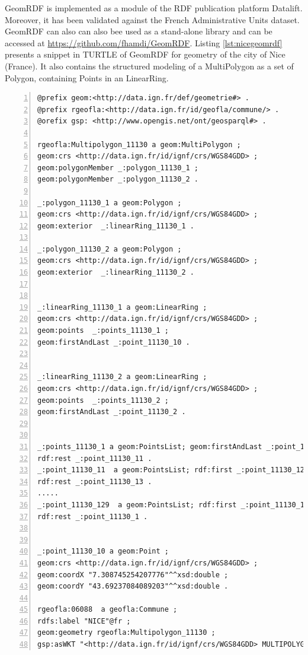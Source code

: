 GeomRDF is implemented as a module of the RDF publication platform Datalift. Moreover, it has been validated against the French Administrative Units dataset. GeomRDF can also can also bee used as a stand-alone library and can be accessed at \url{https://github.com/fhamdi/GeomRDF}. Listing \ref{lst:nicegeomrdf} presents a snippet in TURTLE of GeomRDF for geometry of the city of Nice (France). It also contains the structured modeling of a MultiPolygon as a set of Polygon, containing Points in an LinearRing.



 \begin{lstlisting}[label=lst:nicegeomrdf, float=tp, numbers=left, numberstyle=\tiny, caption = Sample of structured geometry of the city of Nice]
@prefix geom:<http://data.ign.fr/def/geometrie#> .
@prefix rgeofla:<http://data.ign.fr/id/geofla/commune/> .
@orefix gsp: <http://www.opengis.net/ont/geosparql#> .

rgeofla:Multipolygon_11130 a geom:MultiPolygon ;
geom:crs <http://data.ign.fr/id/ignf/crs/WGS84GDD> ;
geom:polygonMember _:polygon_11130_1 ;
geom:polygonMember _:polygon_11130_2 .

_:polygon_11130_1 a geom:Polygon ;
geom:crs <http://data.ign.fr/id/ignf/crs/WGS84GDD> ;
geom:exterior  _:linearRing_11130_1 .

_:polygon_11130_2 a geom:Polygon ;
geom:crs <http://data.ign.fr/id/ignf/crs/WGS84GDD> ;
geom:exterior  _:linearRing_11130_2 .


_:linearRing_11130_1 a geom:LinearRing ;
geom:crs <http://data.ign.fr/id/ignf/crs/WGS84GDD> ;
geom:points  _:points_11130_1 ;
geom:firstAndLast _:point_11130_10 .


_:linearRing_11130_2 a geom:LinearRing ;
geom:crs <http://data.ign.fr/id/ignf/crs/WGS84GDD> ;
geom:points  _:points_11130_2 ;
geom:firstAndLast _:point_11130_2 .


_:points_11130_1 a geom:PointsList; geom:firstAndLast _:point_11130_10 ;
rdf:rest _:point_11130_11 .
_:point_11130_11  a geom:PointsList; rdf:first _:point_11130_12 ;
rdf:rest _:point_11130_13 .
.....
_:point_11130_129  a geom:PointsList; rdf:first _:point_11130_130 ;
rdf:rest _:point_11130_1 .


_:point_11130_10 a geom:Point ;
geom:crs <http://data.ign.fr/id/ignf/crs/WGS84GDD> ;
geom:coordX "7.308745254207776"^^xsd:double ;
geom:coordY "43.69237084089203"^^xsd:double .

rgeofla:06088  a geofla:Commune ;
rdfs:label "NICE"@fr ;
geom:geometry rgeofla:Multipolygon_11130 ;
gsp:asWKT "<http://data.ign.fr/id/ignf/crs/WGS84GDD> MULTIPOLYGON (((7.308745254207776 43.69237084089203, 7.306051040744396 43.68445728916297, ....., 7.308745254207776 43.69237084089203)))"^^gsp:wktLiteral .

\end{lstlisting}


